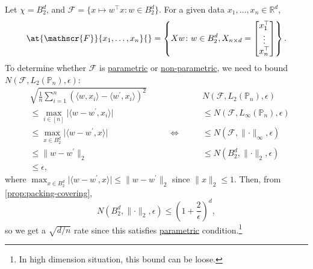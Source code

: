 \begin{eg}
	Let \(\chi = B_2^d\), and \(\mathscr{F} = \{ x \mapsto w^{\top} x \colon w\in B_2^d \} \). For a given data \(x_1, \dots , x_n \in \mathbb{R} ^d\),
	\[
		\at{\mathscr{F}}{x_1, \dots , x_n}{} = \left\{ X w \colon w\in B_2^d, X_{n \times d} = \begin{bmatrix}
			x_1 ^{\top} \\
			\vdots      \\
			x_n ^{\top} \\
		\end{bmatrix} \right\}.
	\]
	To determine whether \(\mathscr{F} \) is \hyperref[def:parametric]{parametric} or \hyperref[def:non-parametric]{non-parametric}, we need to bound \(N(\mathscr{F} , L_2(\mathbb{P} _n), \epsilon )\):
	\[
		\begin{alignedat}{4}
			& \sqrt{\frac{1}{n}\sum_{i=1}^{n} \left( \langle w, x_i \rangle - \langle w^{\prime} , x_i \rangle \right) ^2 } &                    & N(\mathscr{F} , L_2(\mathbb{P} _n), \epsilon )                \\
			& \leq \max _{i\in[n]} \vert \langle w-w^{\prime} , x_i \rangle \vert                                           &                    & \leq N(\mathscr{F} , L_\infty (\mathbb{P} _n), \epsilon )     \\
			& \leq \max _{x\in B_2^d} \vert \langle w - w^{\prime} , x \rangle  \vert                                       & \qquad \iff \qquad & \leq N(\mathscr{F} , \lVert \cdot \rVert _\infty , \epsilon ) \\
			& \leq \lVert w - w^{\prime} \rVert _2                                                                          &                    & \leq N(B_2^d, \lVert \cdot \rVert _2, \epsilon )              \\
			& \leq \epsilon,                                                                                                &                    &
		\end{alignedat}
	\]
	where \(\max _{x\in B_2^d} \vert \langle w - w^{\prime} , x \rangle \vert \leq \lVert w - w^{\prime}  \rVert _2\) since \(\lVert x \rVert _2 \leq 1\). Then, from \autoref{prop:packing-covering},
	\[
		N(B_2^d, \lVert \cdot \rVert _2, \epsilon )
		\leq \left( 1 + \frac{2}{\epsilon } \right)^d,
	\]
	so we get a \(\sqrt{d / n} \) rate since this satisfies \hyperref[def:parametric]{parametric} condition.\footnote{In high dimension situation, this bound can be loose.}
\end{eg}

